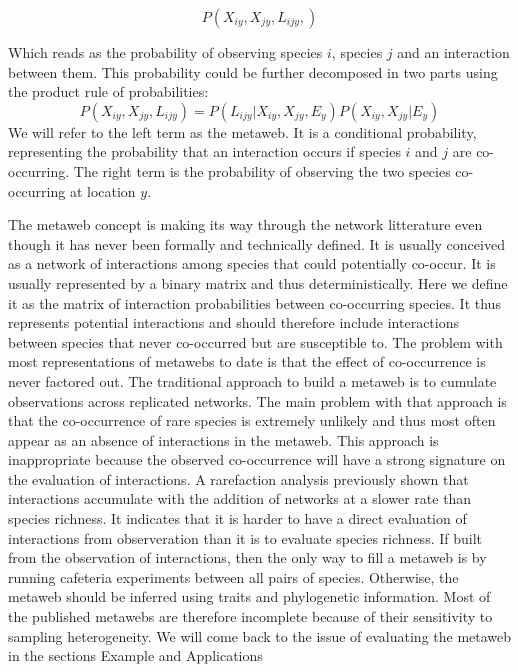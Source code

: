 \documentclass[12pt]{article}
\begin{document}
\begin{equation}
	P(X_{iy},X_{jy},L_{ijy},)
\end{equation}

Which reads as the probability of observing species $i$, species $j$ and an
interaction between them. This probability could be further decomposed in two parts using the
product rule of probabilities:
\begin{equation}
	P(X_{iy},X_{jy},L_{ijy})=P(L_{ijy}|X_{iy},X_{jy},E_y)P(X_{iy},X_{jy}|E_y)
\end{equation}
We will refer to the left term as the metaweb. It is a conditional probability,
representing the probability that an interaction occurs if species $i$ and $j$
are co-occurring. The right term is the probability of observing the two species
co-occurring at location $y$.

The metaweb concept is making its way through the network litterature even
though it has never been formally and technically defined. It is usually
conceived as a network of interactions among species that could potentially
co-occur. It is usually represented by a binary matrix and thus
deterministically. Here we define it as the matrix of interaction probabilities
between co-occurring species. It thus represents potential interactions and
should therefore include interactions between species that never co-occurred but
are susceptible to. The problem with most representations of metawebs to date is
that the effect of co-occurrence is never factored out. The traditional approach
to build a metaweb is to cumulate observations across replicated networks. The
main problem with that approach is that the co-occurrence of rare species is
extremely unlikely and thus most often appear as an absence of interactions in
the metaweb. This approach is inappropriate because the observed co-occurrence
will have a strong signature on the evaluation of interactions. A rarefaction
analysis previously shown that interactions accumulate with the addition of
networks at a slower rate than species richness. It indicates that it is harder
to have a direct evaluation of interactions from observeration than it is to
evaluate species richness. If built from the observation of interactions, then
the only way to fill a metaweb is by running cafeteria experiments between all
pairs of species. Otherwise, the metaweb should be inferred using traits and
phylogenetic information. Most of the published metawebs are therefore
incomplete because of their sensitivity to sampling heterogeneity. We will come
back to the issue of evaluating the metaweb in the sections Example and Applications
\end{document}
